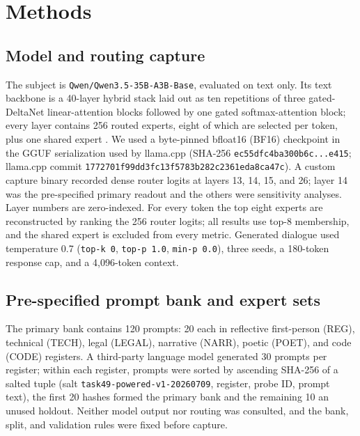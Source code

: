 \documentclass[10pt,a4paper,twocolumn]{article}
\begin{document}
\section{Methods}\label{sec:methods}

\subsection{Model and routing capture}

The subject is \texttt{Qwen/Qwen3.5-35B-A3B-Base}, evaluated on text only. Its
text backbone is a 40-layer hybrid stack laid out as ten repetitions of three
gated-DeltaNet linear-attention blocks followed by one gated softmax-attention
block; every layer contains 256 routed experts, eight of which are selected
per token, plus one shared expert \cite{qwen2026}. We used a byte-pinned
bfloat16 (BF16) checkpoint in the GGUF serialization used by llama.cpp
(SHA-256 \texttt{ec55dfc4ba300b6c...e415}; llama.cpp commit
\texttt{1772701f99dd3fc13f5783b282c2361eda8ca47c}). A custom capture binary
recorded dense router logits at layers 13, 14, 15, and 26; layer 14 was the
pre-specified primary readout and the others were sensitivity analyses. Layer
numbers are zero-indexed. For every token the top eight experts are
reconstructed by ranking the 256 router logits; all results use top-8
membership, and the shared expert is excluded from every metric. Generated
dialogue used temperature 0.7 (\texttt{top-k 0}, \texttt{top-p 1.0},
\texttt{min-p 0.0}), three seeds, a 180-token response cap, and a 4,096-token
context.

\subsection{Pre-specified prompt bank and expert sets}

The primary bank contains 120 prompts: 20 each in reflective first-person
(REG), technical (TECH), legal (LEGAL), narrative (NARR), poetic (POET), and
code (CODE) registers. A third-party language model generated 30 prompts per
register; within each register, prompts were sorted by ascending SHA-256 of a
salted tuple (salt \texttt{task49-powered-v1-20260709}, register, probe ID,
prompt text), the first 20 hashes formed the primary bank and the remaining 10
an unused holdout. Neither model output nor routing was consulted, and the
bank, split, and validation rules were fixed before capture.
\end{document}
